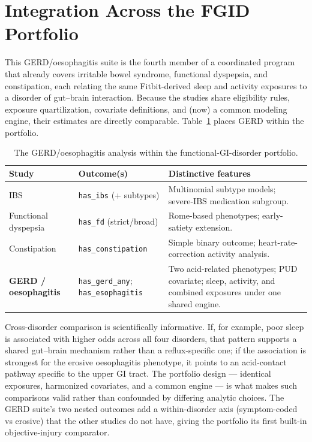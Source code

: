 \documentclass[11pt]{article}
\newcommand{\code}[1]{\texttt{\small #1}}
\begin{document}
\section{Integration Across the FGID Portfolio}
This GERD/oesophagitis suite is the fourth member of a coordinated program that already covers irritable
bowel syndrome, functional dyspepsia, and constipation, each relating the same Fitbit-derived sleep and
activity exposures to a disorder of gut--brain interaction. Because the studies share eligibility rules,
exposure quartilization, covariate definitions, and (now) a common modeling engine, their estimates are
directly comparable. Table~\ref{tab:portfolio} places GERD within the portfolio.

\begin{table}[h]
\centering
\footnotesize
\begin{tabular}{@{}p{2.7cm}p{3.4cm}p{6.4cm}@{}}
\toprule
\textbf{Study} & \textbf{Outcome(s)} & \textbf{Distinctive features} \\
\midrule
IBS & \code{has_ibs} (+ subtypes) & Multinomial subtype models; severe-IBS medication subgroup. \\
Functional dyspepsia & \code{has_fd} (strict/broad) & Rome-based phenotypes; early-satiety extension. \\
Constipation & \code{has_constipation} & Simple binary outcome; heart-rate-correction activity analysis. \\
\textbf{GERD / oesophagitis} & \code{has_gerd_any}; \code{has_esophagitis} & Two acid-related phenotypes; PUD covariate; sleep, activity, and combined exposures under one shared engine. \\
\bottomrule
\end{tabular}
\caption{The GERD/oesophagitis analysis within the functional-GI-disorder portfolio.}
\label{tab:portfolio}
\end{table}

Cross-disorder comparison is scientifically informative. If, for example, poor sleep is associated with
higher odds across all four disorders, that pattern supports a shared gut--brain mechanism rather than a
reflux-specific one; if the association is strongest for the erosive oesophagitis phenotype, it points to
an acid-contact pathway specific to the upper GI tract. The portfolio design --- identical exposures,
harmonized covariates, and a common engine --- is what makes such comparisons valid rather than
confounded by differing analytic choices. The GERD suite's two nested outcomes add a within-disorder
axis (symptom-coded vs erosive) that the other studies do not have, giving the portfolio its first
built-in objective-injury comparator.
\end{document}
